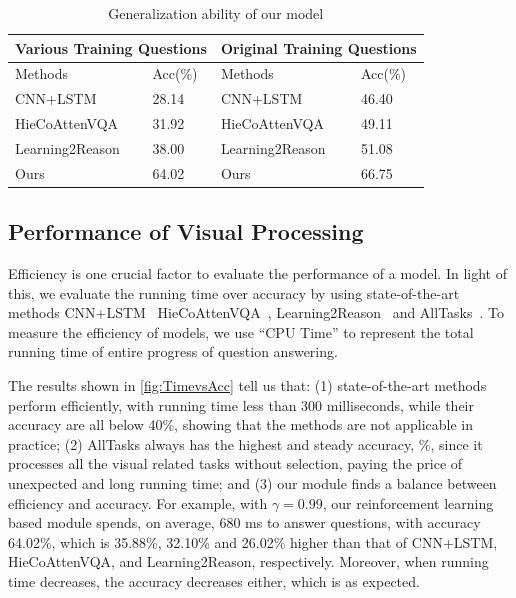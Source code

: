 \begin{table}[h]
	\small
	\begin{tabular}{|l|l||l|l|}
		\hline
		\multicolumn{2}{|l||}{Various Training Questions} & \multicolumn{2}{l|}{Original Training Questions} \\ \hline \hline
		Methods                  & Acc(\%)            & Methods                   & Acc(\%)             \\ \hline
		CNN+LSTM                    & 28.14              & CNN+LSTM                     & 46.40               \\ \hline
		HieCoAttenVQA               & 31.92              & HieCoAttenVQA                & 49.11               \\ \hline
		Learning2Reason             & 38.00              & Learning2Reason              & 51.08               \\ \hline
		Ours                        & 64.02              & Ours                         & 66.75               \\ \hline
	\end{tabular}
	\caption{Generalization ability of our model} \label{table:genralization}
\end{table}


\subsection{Performance of Visual Processing}

Efficiency is one crucial factor to evaluate the performance of a \vqa model. 
In light of this, we evaluate the running time over accuracy by using state-of-the-art methods CNN+LSTM~\cite{VQA} HieCoAttenVQA~\cite{Lu2016Hie}, Learning2Reason~\cite{hu2017learning} and AllTasks~\cite{peixi2019}. To measure the efficiency of \vqa models, we use ``CPU Time'' to represent the total running time of entire progress of question answering. 

The results shown in \cref{fig:TimevsAcc} tell us that: (1) state-of-the-art methods perform efficiently, with running time less than 300 milliseconds, while their accuracy are all below 40\%, showing that the methods are not applicable in practice; (2) AllTasks always has the highest and steady accuracy, \%, since it processes all the visual related tasks without selection, paying the price of unexpected and long running time; and (3) our module finds a balance between efficiency and accuracy. For example, with $\gamma=0.99$, our reinforcement learning based module spends, on average, 680 ms to answer questions, with accuracy 64.02\%, which is 35.88\%, 32.10\% and 26.02\% higher than that of CNN+LSTM, HieCoAttenVQA, and Learning2Reason, respectively. Moreover, when running time decreases, the accuracy decreases either, which is as expected.

